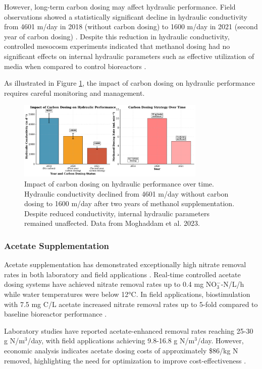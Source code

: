 \documentclass[12pt,a4paper]{article}
\begin{document}
However, long-term carbon dosing may affect hydraulic performance. Field observations showed a statistically significant decline in hydraulic conductivity from 4601 m/day in 2018 (without carbon dosing) to 1600 m/day in 2021 (second year of carbon dosing) \citep{RN242}. Despite this reduction in hydraulic conductivity, controlled mesocosm experiments indicated that methanol dosing had no significant effects on internal hydraulic parameters such as effective utilization of media when compared to control bioreactors \citep{RN242}.

As illustrated in Figure \ref{fig:hydraulic_performance}, the impact of carbon dosing on hydraulic performance requires careful monitoring and management.

\begin{figure}[ht]
\centering
\includegraphics[width=0.8\textwidth]{fig3_hydraulic_performance_scientific}
\caption{Impact of carbon dosing on hydraulic performance over time. Hydraulic conductivity declined from 4601 m/day without carbon dosing to 1600 m/day after two years of methanol supplementation. Despite reduced conductivity, internal hydraulic parameters remained unaffected. Data from Moghaddam et al. 2023.}
\label{fig:hydraulic_performance}
\end{figure}

\subsubsection{Acetate Supplementation}

Acetate supplementation has demonstrated exceptionally high nitrate removal rates in both laboratory and field applications \citep{RN242}. Real-time controlled acetate dosing systems have achieved nitrate removal rates up to 0.4 mg NO$_3^-$-N/L/h while water temperatures were below 12°C. In field applications, biostimulation with 7.5 mg C/L acetate increased nitrate removal rates up to 5-fold compared to baseline bioreactor performance \citep{RN242}.

Laboratory studies have reported acetate-enhanced removal rates reaching 25-30 g N/m$^3$/day, with field applications achieving 9.8-16.8 g N/m$^3$/day. However, economic analysis indicates acetate dosing costs of approximately \$86/kg N removed, highlighting the need for optimization to improve cost-effectiveness \citep{RN242}.
\end{document}
